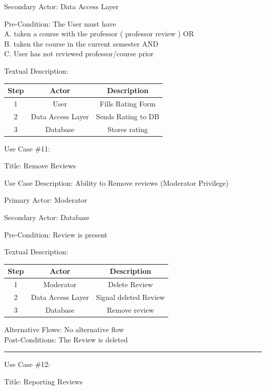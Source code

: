 \documentclass{article}
\begin{document}
  Secondary Actor: Data Access Layer
	
  Pre-Condition: The User must have\\
				A. taken a course with the professor ( professor review ) OR\\
				B. taken the course in the current semester 		AND\\
				C. User has not reviewed professor/course prior
	
        Textual Description:

\begin{center} 
\begin{tabular}{|c|c|c|}
\hline
Step &
Actor &
Description \\ \hline
1 &
User &
Fills Rating Form \\
2&
Data Access Layer&
Sends Rating to DB\\
3&
Database&
Stores rating \\ \hline
\end{tabular}
\end{center} 

Use Case \#11: 

	Title: Remove Reviews

	Use Case Description: Ability to Remove reviews (Moderator Privilege) 

	Primary Actor: Moderator

	Secondary Actor: Database

	Pre-Condition: Review is present

	Textual Description:

\begin{center} 
\begin{tabular}{|c|c|c|}
  \hline
  Step &
  Actor &
Description \\ \hline
  1&
  Moderator &
Delete Review \\
  2 &
  Data Access Layer &
Signal deleted Review \\
  3&
  Database &
Remove review \\ \hline
\end{tabular}
\end{center}

Alternative Flows: No alternative flow\\
	Post-Conditions: The Review is deleted\\

\hrule

Use Case \#12: 

	Title: Reporting Reviews
\end{document}
